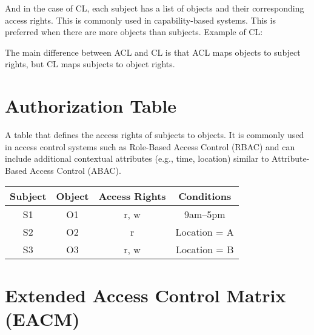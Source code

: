 \documentclass[12pt letter]{report}
\begin{document}
And in the case of CL, each subject has a list of objects and their
corresponding access rights. This is commonly used in
capability-based systems. This is preferred when there are more
objects than subjects.
Example of CL:
\begin{figure}[H]
  \centering
\end{figure}

The main difference between ACL and CL is that ACL maps objects to
subject rights, but CL maps subjects to object rights.

\section{Authorization Table}
A table that defines the access rights of subjects to objects. It is commonly
used in access control systems such as Role-Based Access Control (RBAC) and
can include additional contextual attributes (e.g., time, location) similar to
Attribute-Based Access Control (ABAC).

\begin{table}[H]
  \centering
  \begin{tabular}{|c|c|c|c|}
    \hline
    \textbf{Subject} & \textbf{Object} & \textbf{Access Rights} &
    \textbf{Conditions} \\
    \hline
    S1 & O1 & r, w & 9am–5pm \\
    S2 & O2 & r & Location = A \\
    S3 & O3 & r, w & Location = B \\
    \hline
  \end{tabular}
\end{table}

\section{Extended Access Control Matrix (EACM)}
\end{document}
